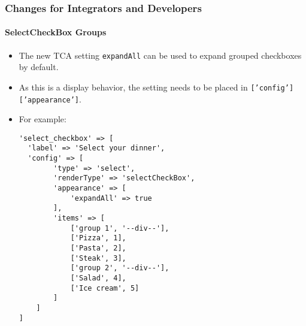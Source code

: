 %

\begin{frame}[fragile]
	\frametitle{Changes for Integrators and Developers}
	\framesubtitle{SelectCheckBox Groups}


	\begin{itemize}
		\item The new TCA setting \texttt{expandAll} can be used to expand
			grouped checkboxes by default.
		\item As this is a display behavior, the setting needs to be placed
		 	in \texttt{['config']['appearance']}.
		\item For example:
\begin{lstlisting}
'select_checkbox' => [
  'label' => 'Select your dinner',
  'config' => [
        'type' => 'select',
        'renderType' => 'selectCheckBox',
        'appearance' => [
            'expandAll' => true
        ],
        'items' => [
            ['group 1', '--div--'],
            ['Pizza', 1],
            ['Pasta', 2],
            ['Steak', 3],
            ['group 2', '--div--'],
            ['Salad', 4],
            ['Ice cream', 5]
        ]
    ]
]
\end{lstlisting}

	\end{itemize}

\end{frame}

